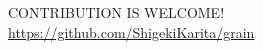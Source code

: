 \documentclass[aspectratio=169,
  14pt,xcolor=dvipsnames,table,professional font,dvipdfmx]{beamer}
\begin{document}
{

\begin{frame}{} %
  \vspace*{10em}
    \begin{center}
      \large
      CONTRIBUTION IS WELCOME!
      \\
      \alert{\url{https://github.com/ShigekiKarita/grain}}
    \end{center}
\end{frame}
}
\end{document}
